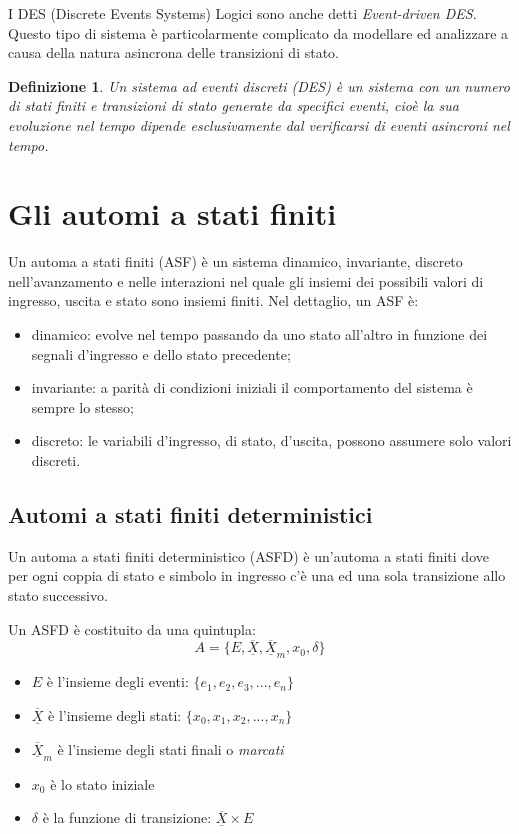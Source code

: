 \documentclass[a4paper]{report}
\newtheorem{definizione}{Definizione}
\begin{document}
I DES (Discrete Events Systems) Logici sono anche detti {\em
  Event-driven DES}. Questo tipo di sistema \`e particolarmente complicato da
modellare ed analizzare a causa della natura asincrona delle
transizioni di stato.

\begin{definizione}\label{def:DES}
  Un sistema ad eventi discreti (DES) \`e un sistema con un numero di
  stati finiti e transizioni di stato generate da specifici eventi,
  cio\`e la sua evoluzione nel tempo dipende esclusivamente dal
  verificarsi di eventi asincroni nel tempo.
\end{definizione}

\section{Gli automi a stati finiti}
Un automa a stati finiti (ASF) \`e un sistema dinamico, invariante,
discreto nell'avanzamento e nelle interazioni nel quale gli insiemi
dei possibili valori di ingresso, uscita e stato sono insiemi finiti.
Nel dettaglio, un ASF \`e:
\begin{itemize}
\item dinamico: evolve nel tempo passando da uno stato all'altro in
  funzione dei segnali d'ingresso e dello stato precedente;
\item invariante: a parit\`a di condizioni iniziali il comportamento
  del sistema \`e sempre lo stesso;
\item discreto: le variabili d'ingresso, di stato, d'uscita, possono
  assumere solo valori discreti.
\end{itemize}

\subsection{Automi a stati finiti deterministici}
Un automa a stati finiti deterministico (ASFD) \`e un'automa a stati
finiti dove per ogni coppia di stato e simbolo in ingresso c'\`e una
ed una sola transizione allo stato successivo.

Un ASFD \`e costituito da una quintupla:
\begin{equation}
  A = \{ E, \overline{\underline{X}}, \overline{\underline{X}}_m, x_0,
  \delta \}
\end{equation}
\begin{itemize}
\item $E$ \`e l'insieme degli eventi: $\{ e_1, e_2, e_3, ..., e_n\}$
\item $\overline{\underline{X}}$ \`e l'insieme degli stati: $\{ x_0, x_1,
  x_2, ..., x_n\}$
\item $\overline{\underline{X}}_m$ \`e l'insieme degli stati finali o {\em
  marcati}
\item $x_0$ \`e lo stato iniziale
\item $\delta$ \`e la funzione di transizione: $\overline{\underline{X}}
  \times E$
\end{itemize}
\end{document}
